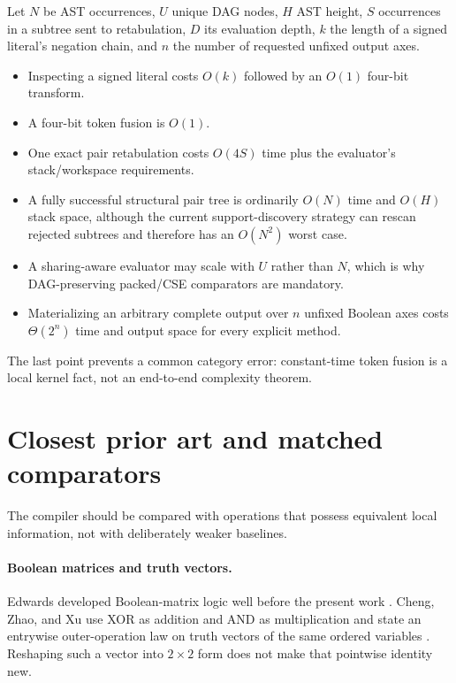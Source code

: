 \documentclass[10pt]{article}
\theoremstyle{plain}
\theoremstyle{definition}
\theoremstyle{remark}
\begin{document}
Let $N$ be AST occurrences, $U$ unique DAG nodes, $H$ AST height, $S$ occurrences in a subtree sent to retabulation, $D$ its evaluation depth, $k$ the length of a signed literal's negation chain, and $n$ the number of requested unfixed output axes.

\begin{itemize}
 \item Inspecting a signed literal costs $O(k)$ followed by an $O(1)$ four-bit transform.
 \item A four-bit token fusion is $O(1)$.
 \item One exact pair retabulation costs $O(4S)$ time plus the evaluator's stack/workspace requirements.
 \item A fully successful structural pair tree is ordinarily $O(N)$ time and $O(H)$ stack space, although the current support-discovery strategy can rescan rejected subtrees and therefore has an $O(N^2)$ worst case.
 \item A sharing-aware evaluator may scale with $U$ rather than $N$, which is why DAG-preserving packed/CSE comparators are mandatory.
 \item Materializing an arbitrary complete output over $n$ unfixed Boolean axes costs $\Theta(2^n)$ time and output space for every explicit method.
\end{itemize}

The last point prevents a common category error: constant-time token fusion is a local kernel fact, not an end-to-end complexity theorem.

\section{Closest prior art and matched comparators}
\label{sec:related}

The compiler should be compared with operations that possess equivalent local information, not with deliberately weaker baselines.

\paragraph{Boolean matrices and truth vectors.}
Edwards developed Boolean-matrix logic well before the present work \cite{Edwards1972}. Cheng, Zhao, and Xu use XOR as addition and AND as multiplication and state an entrywise outer-operation law on truth vectors of the same ordered variables \cite{Cheng2011}. Reshaping such a vector into $2\times2$ form does not make that pointwise identity new.
\end{document}
